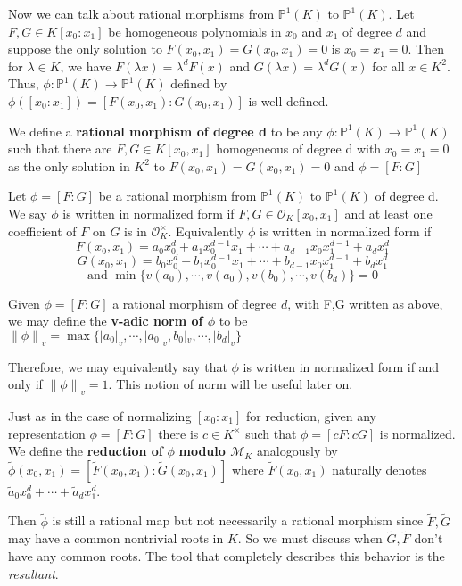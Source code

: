 \documentclass{amsart}
\newcommand\norm[1]{\left\lVert#1\right\rVert}
\newcommand{\MCM}{\mathcal{M}}
\newcommand{\MCO}{\mathcal{O}}
\begin{document}
Now we can talk about rational morphisms from $\mathbb{P}^1(K)$ to $\mathbb{P}^1(K)$.   Let $F,G \in K[x_0: x_1]$ be  homogeneous polynomials in $x_0$ and $x_1$ of degree $d$ and suppose the only solution to  $F(x_0,x_1)=G(x_0,x_1)=0$ is $x_0=x_1=0$. Then for $\lambda \in K$, we have $F(\lambda x)=\lambda^dF(x)$ and $G(\lambda x)=\lambda^dG(x)$ for all $x \in K^2$. 
Thus, $\phi: \mathbb{P}^1(K) \rightarrow \mathbb{P}^1(K)$ defined by $\phi([x_0: x_1])=[F(x_0,x_1): G(x_0,x_1)]$ is well defined. 

We define a \textbf{rational morphism of degree d} to be any $\phi:\mathbb{P}^1(K) \rightarrow \mathbb{P}^1(K)$ such that there are $F,G \in K[x_0,x_1]$ homogeneous of degree d with $x_0=x_1=0$ as the only solution in $K^2$ to $F(x_0,x_1)=G(x_0,x_1)=0$ and $\phi = [F:G]$

Let $\phi=[F:G]$ be a rational morphism from $\mathbb{P}^1(K)$ to $\mathbb{P}^1(K)$ of degree d. We say $\phi$ is written in normalized form if $F,G \in \MCO_K[x_0,x_1]$ and at least one coefficient of $F$ on $G$ is in $\MCO_K^{\times}$. Equivalently $\phi$ is written in normalized form if \[F(x_0,x_1)=a_0x_0^d+a_1x_0^{d-1}x_1 + \cdots + a_{d-1}x_0x_1^{d-1}+a_dx_1^d\] \[G(x_0,x_1)=b_0x_0^d + b_1x_0^{d-1}x_1 + \cdots + b_{d-1}x_0x_1^{d-1}+b_dx_1^d\] \[ \text{and }\min\{v(a_0), \cdots, v(a_0), v(b_0), \cdots, v(b_d)\}=0\]

Given $\phi = [F:G]$ a rational morphism of degree $d$, with F,G written as above, we may define the \textbf{v-adic norm of $\phi$} to be $\norm{\phi}_v = \max\{|a_0|_v, \cdots, |a_0|_v, b_0|_v, \cdots, |b_d|_v\}$

Therefore, we may equivalently say that $\phi$ is written in normalized form if and only if $\norm{\phi}_v = 1$. This notion of norm will be useful later on.

Just as in the case of normalizing $[x_0:x_1]$ for reduction, given any representation $\phi =[F:G]$ there is $c \in K^{\times}$ such that $\phi=[cF:cG]$ is normalized.  We define the \textbf{reduction of} $\phi$ \textbf{ modulo $\MCM_K$} analogously by $\tilde{\phi}(x_0, x_1)=[\tilde{F}(x_0,x_1): \tilde{G}(x_0,x_1)]$ where $\tilde{F}(x_0,x_1)$ naturally denotes $\tilde{a}_0x_0^d + \cdots +\tilde{a}_dx_1^d$. 
 
Then $\tilde{\phi}$ is still a rational map but not necessarily a rational morphism since $\tilde{F}, \tilde{G}$ may have a common nontrivial roots in $K$.  So we must discuss when $\tilde{G}, \tilde{F}$ don't have any common roots. The tool that completely describes this behavior is the \emph{resultant}. 
 
\end{document}
